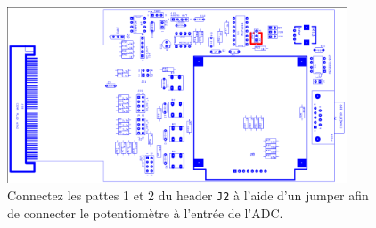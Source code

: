 \documentclass[11pt,a4paper]{article}
\theoremstyle{definition}%
\begin{document}
\begin{figure}[h]
\centering
\includegraphics[width=0.9\textwidth]{extension-board-jumper}
\caption{Connectez les pattes 1 et 2 du header \texttt{J2} à l'aide d'un jumper afin de connecter le potentiomètre à l'entrée de l'ADC.}
\label{fig:extension-board-jumper}
\end{figure}
\end{document}
